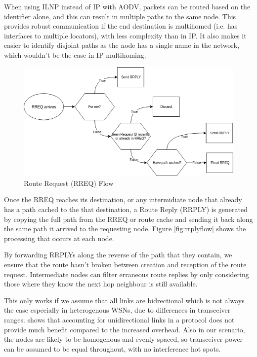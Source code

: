 \documentclass[12pt]{article}
\begin{document}
When using ILNP instead of IP with AODV, packets can be routed based on the identifier alone, and this can result in multiple paths to the same node. This provides robust communication if the end destination is multihomed (i.e. has interfaces to multiple locators), with less complexity than in IP. It also makes it easier to identify disjoint paths as the node has a single name in the network, which wouldn't be the case in IP multihoming. 

\begin{figure}[!h]
	\centering
	\includegraphics[width=\linewidth]{images/rreqflow}
	\caption{Route Request (RREQ) Flow}
	\label{fig:rreqflow}
\end{figure}

Once the RREQ reaches its destination, or any intermidiate node that already has a path cached to the that destination, a Route Reply (RRPLY) is generated by copying the full path from the RREQ or route cache and sending it back along the same path it arrived to the requesting node. Figure \ref{fig:rrplyflow} shows the processing that occurs at each node.

By forwarding RRPLYs along the reverse of the path that they contain, we ensure that the route hasn't broken between creation and reception of the route request. Intermediate nodes can filter erraneous route replies by only considering those where they know the next hop neighbour is still available.

This only works if we assume that all links are bidrectional which is not always the case especially in heterogenous WSNs, due to differences in transceiver ranges. 
\cite{unidirec} shows that accounting for unidirectional links in a protocol does not provide much benefit compared to the increased overhead. Also in our scenario, the nodes are likely to be homogenous and evenly spaced, so transceiver power can be assumed to be equal throughout, with no interference hot spots. 
\end{document}
